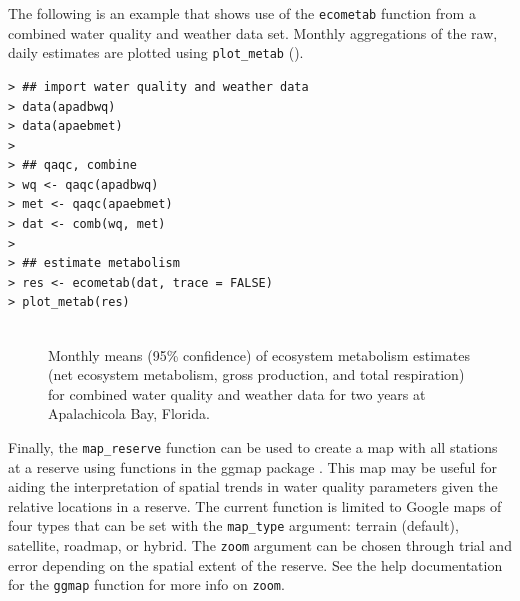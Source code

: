 \documentclass[10pt,letterpaper]{article}\usepackage[]{graphicx}\usepackage[]{color}
\makeatletter
\newenvironment{kframe}{%
 \def\at@end@of@kframe{}%
 \ifinner\ifhmode%
  \def\at@end@of@kframe{\end{minipage}}%
  \begin{minipage}{\columnwidth}%
 \fi\fi%
 \def\FrameCommand##1{\hskip\@totalleftmargin \hskip-\fboxsep
 \colorbox{shadecolor}{##1}\hskip-\fboxsep
     \hskip-\linewidth \hskip-\@totalleftmargin \hskip\columnwidth}%
 \MakeFramed {\advance\hsize-\width
   \@totalleftmargin\z@ \linewidth\hsize
   \@setminipage}}%
 {\par\unskip\endMakeFramed%
 \at@end@of@kframe}
\newenvironment{knitrout}{}{} %
\makeatother
\begin{document}
The following is an example that shows use of the \texttt{ecometab} function from a combined water quality and weather data set.  Monthly aggregations of the raw, daily estimates are plotted using \texttt{plot\_metab} ().

\begin{knitrout}\small
{}\color{fgcolor}\begin{kframe}
\begin{verbatim}
> ## import water quality and weather data
> data(apadbwq)
> data(apaebmet)
> 
> ## qaqc, combine
> wq <- qaqc(apadbwq)
> met <- qaqc(apaebmet)
> dat <- comb(wq, met)
> 
> ## estimate metabolism
> res <- ecometab(dat, trace = FALSE)
> plot_metab(res)
\end{verbatim}
\end{kframe}\begin{figure}[!h]

{\centering \includegraphics[width=0.00\textwidth]{figure/metab_ex-1} 

}

\caption[Monthly means (95\% confidence) of ecosystem metabolism estimates (net ecosystem metabolism, gross production, and total respiration) for combined water quality and weather data for two years at Apalachicola Bay, Florida]{Monthly means (95\% confidence) of ecosystem metabolism estimates (net ecosystem metabolism, gross production, and total respiration) for combined water quality and weather data for two years at Apalachicola Bay, Florida.}\label{fig:metab_ex}
\end{figure}


\end{knitrout}

Finally, the \texttt{map\_reserve} function can be used to create a map with all stations at a reserve using functions in the ggmap package \cite{Kahle13}. This map may be useful for aiding the interpretation of spatial trends in water quality parameters given the relative locations in a reserve.  The current function is limited to Google maps of four types that can be set with the \texttt{map\_type} argument: terrain (default), satellite, roadmap, or hybrid.  The \texttt{zoom} argument can be chosen through trial and error depending on the spatial extent of the reserve.  See the help documentation for the \texttt{ggmap} function for more info on \texttt{zoom}.
\end{document}
